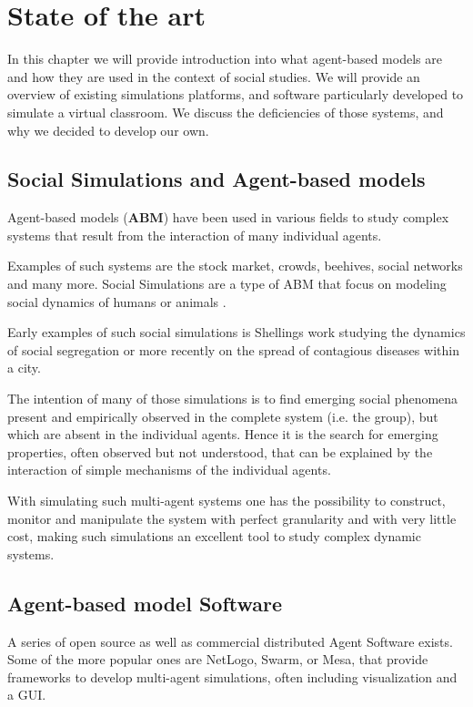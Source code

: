 \label{StateOfTheArt}
\chapter{State of the art}
In this chapter we will provide introduction into what agent-based models are and
how they are used in the context of social studies. We will provide an overview
of existing simulations platforms, and software particularly developed to simulate
a virtual classroom. We discuss the deficiencies of those systems, and why
we decided to develop our own.

\section{Social Simulations and Agent-based models}
Agent-based models (\textbf{ABM})\cite{Jackson2017} have been used in various fields
to study complex systems that result from the interaction of many individual agents.

Examples of such systems are the stock market, crowds, beehives, social networks and many
more. Social Simulations are a type of ABM that focus on modeling social dynamics
of humans or animals \cite{Helbing2012}.

Early examples of such social simulations is Shellings work \cite{Schelling1971}
studying the dynamics of social segregation or more recently on the spread of
contagious diseases\cite{Perez2009} within a city.

\bb

The intention of many of those simulations is to find emerging social phenomena
present and empirically observed in the complete system (i.e. the group), but
which are absent in the individual agents\cite{Jackson2017}.
Hence it is the search for emerging properties, often observed but not understood,
that can be explained by the interaction of simple mechanisms of the individual agents.

\bb

With simulating such multi-agent systems one has the possibility to construct, monitor
and manipulate the system with perfect granularity and with very little cost, making
such simulations an excellent tool to study complex dynamic systems.

\section{Agent-based model Software}
A series of open source as well as commercial distributed Agent Software\cite{Kravi2015}
exists. Some of the more popular ones are NetLogo\cite{Tissue2004},
Swarm\cite{Minar1996}, or Mesa\cite{Masad2015}, that provide frameworks
to develop multi-agent simulations, often including visualization and
a GUI.

